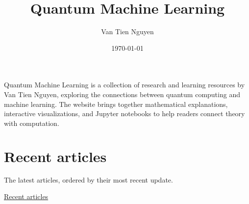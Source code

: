 \documentclass{article}
\title{Quantum Machine Learning}
\author{Van Tien Nguyen}
\date{\today}
\begin{document}
\maketitle

Quantum Machine Learning is a collection of research and learning resources by Van Tien Nguyen, exploring the connections between quantum computing and machine learning. The website brings together mathematical explanations, interactive visualizations, and Jupyter notebooks to help readers connect theory with computation.

\section{Recent articles}
The latest articles, ordered by their most recent update.

\href{qml-home:recent}{Recent articles}
\end{document}
